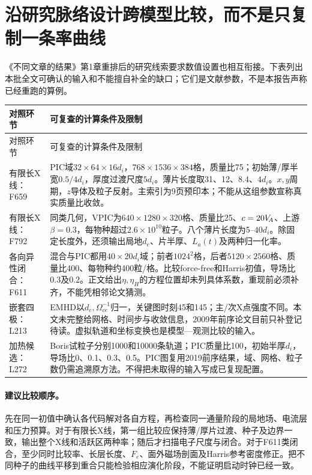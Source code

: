 \documentclass[UTF8,a4paper,11pt,openany,fontset=fandol]{ctexbook}
\begin{document}
\section{沿研究脉络设计跨模型比较，而不是只复制一条率曲线}
《不同文章的结果》第1章重排后的研究线索要求数值设置也相互衔接。下表列出本批全文可确认的输入和不能擅自补全的缺口；它们是文献参数，不是本报告声称已经重跑的算例。
\begin{longtable}{P{29mm}P{119mm}}
\toprule 对照环节 & 可复查的计算条件及限制\\\midrule\endfirsthead
\toprule 对照环节 & 可复查的计算条件及限制\\\midrule\endhead
有限长X线：F659 &
PIC域$32\times64\times16d_i$，$768\times1536\times384$格，质量比75；初始薄/厚半宽$0.5/4d_i$，厚度过渡尺度$5d_i$。薄片长度取31、12、8.4、$4d_i$。$x,y$周期，$z$导体及粒子反射。主索引为9页预印本；不能从这组参数宣称真实质量比收敛。\\
有限长X线：F792 &
同类几何，VPIC为$640\times1280\times320$格、质量比25、$c=20V_{\!A}$、上游$\beta=0.3$，每物种超过$2.6\times10^{10}$粒子。八个薄片长度为5--$40d_i$。除固定长度外，还须输出局地$d_e$、片半厚、$L_a(t)$及两种归一化率。\\
各向异性闭合：F611 &
混合与PIC都用$40\times20d_i$域；前者$1024^2$格，后者$5120\times2560$格、质量比400、每物种约400粒/格。比较force-free和Harris初值，导场比0.3及0.2。正文给出$\eta,\eta_H$的方程位置却未列具体系数，重现前必须补齐，不能凭相邻论文猜测。\\
嵌套四极：L213 &
EMHD以$d_e,\Omega_{ce}^{-1}$归一，关键图时刻45和145；主/次X点强度不同。本文未完整给网格、时间步与收敛信息，2009年前序论文目前只补登记待读。虚拟轨道和坐标变换也是模型—观测比较的输入。\\
加热候选：L272 &
Boris试粒子分别1000和10000条轨道；PIC质量比100，初始半厚$d_i$，导场比0、0.1、0.3、0.5。PIC图复用2019前序结果，域、网格、粒子数仍需追溯原方法。不得把未取得的输入写成已复现配置。\\
\bottomrule
\end{longtable}
\citep{F659,F792,F611,L213,L272}

\paragraph{建议比较顺序。}
先在同一初值中确认各代码解对各自方程，再检查同一通量阶段的局地场、电流层和压力预算。对于有限长X线，第一组比较应保持薄/厚片过渡、种子及边界一致，输出整个X线和活跃区两种率；随后才扫描电子尺度与闭合。对于F611类闭合，至少同时比较率、长层长度、$F_e$、面外磁场剖面及Harris参考密度修正。把不同种子的曲线平移到重合只能检验相应演化阶段，不能证明启动时钟已经一致。
\end{document}
